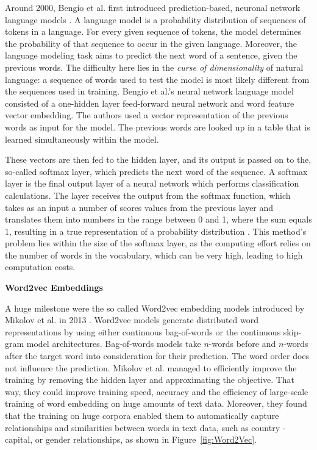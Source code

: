 Around 2000, Bengio et al. first introduced prediction-based, neuronal network language models \cite{bengio2003neural}. A language model is a probability distribution of sequences of tokens in a language. For every given sequence of tokens, the model determines the probability of that sequence to occur in the given language. Moreover, the language modeling task aims to predict the next word of a sentence, given the previous words. The difficulty here lies in the \textit{curse of dimensionality} of natural language: a sequence of words used to test the model is most likely different from the sequences used in training. Bengio et al.'s neural network language model consisted of a one-hidden layer feed-forward neural network and word feature vector embedding. %
The authors used a vector representation of the previous words as input for the model. The previous words are looked up in a table that is learned simultaneously within the model. 

These vectors are then fed to the hidden layer, and its output is passed on to the, so-called softmax layer, which predicts the next word of the sequence. A softmax layer is the final output layer of a neural network which performs classification calculations. The layer receives the output from the softmax function, which takes as an input a number of scores values from the previous layer and translates them into numbers in the range between 0 and 1, where the sum equals 1, resulting in a true representation of a probability distribution \cite{buduma2017fundamentals}. 
This method's problem lies within the size of the softmax layer, as the computing effort relies on the number of words in the vocabulary, which can be very high, leading to high computation costs.

\textbf{Word2vec Embeddings} 
\label{sec:Word2vec_embeddings}

A huge milestone were the so called Word2vec embedding models introduced by Mikolov et al. in 2013 \cite{mikolov2013efficient}. 
Word2vec models generate distributed word representations by using either continuous bag-of-words or the continuous skip-gram model architectures. 
Bag-of-words models take $n$-words before and $n$-words after the target word into consideration for their prediction. The word order does not influence the prediction. Mikolov et al. managed to efficiently improve the training by removing the hidden layer and approximating the objective. That way, they could improve training speed, accuracy and the efficiency of large-scale training of word embedding on huge amounts of text data.
Moreover, they found that the training on huge corpora enabled them to automatically capture relationships and similarities between words in text data, such as country - capital, or gender relationships, as shown in Figure~\ref{fig:Word2Vec}.

